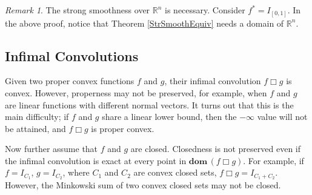 \documentclass[openany]{book}
\theoremstyle{definition}
\theoremstyle{remark}
\newtheorem*{remark}{Remark}
\begin{document}
\begin{remark}
    The strong smoothness over $\mathbb{R}^n$ is necessary. Consider $f^*=I_{[0,1]}$. In the above proof, notice that Theorem \ref{StrSmoothEquiv} needs a domain of $\mathbb{R}^n$.
\end{remark}

\subsection{Infimal Convolutions}
Given two proper convex functions $f$ and $g$, their infimal convolution $f\Box g$ is convex. However, properness may not be preserved, for example, when $f$ and $g$ are linear functions with different normal vectors. It turns out that this is the main difficulty; if $f$ and $g$ share a linear lower bound, then the $-\infty$ value will not be attained, and $f\Box g$ is proper convex.

Now further assume that $f$ and $g$ are closed. Closedness is not preserved even if the infimal convolution is exact at every point in $\mathbf{dom}\,(f\Box g)$. For example, if $f=I_{C_1}$, $g=I_{C_2}$, where $C_1$ and $C_2$ are convex closed sets, $f\Box g=I_{C_1+C_2}$. However, the Minkowski sum of two convex closed sets may not be closed.
\end{document}

